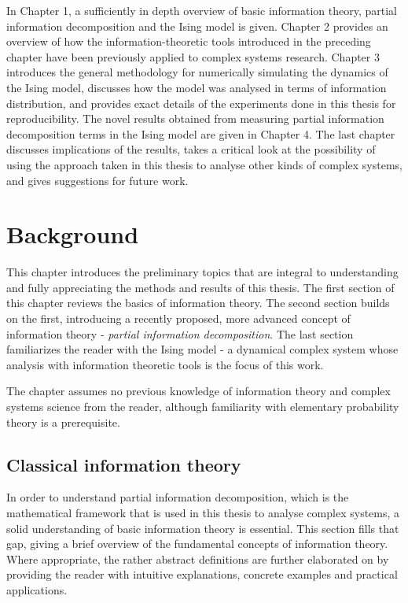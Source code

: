 \documentclass[12pt]{article}
\begin{document}
In Chapter 1, a sufficiently in depth overview of basic information theory, partial information decomposition and the Ising model is given. Chapter 2 provides an overview of how the information-theoretic tools introduced in the preceding chapter have been previously applied to complex systems research. Chapter 3 introduces the general methodology for numerically simulating the dynamics of the Ising model, discusses how the model was analysed in terms of information distribution, and provides exact details of the experiments done in this thesis for reproducibility. The novel results obtained from measuring partial information decomposition terms in the Ising model are given in Chapter 4. The last chapter  discusses implications of the results, takes a critical look at the possibility of using the approach taken in this thesis to analyse other kinds of complex systems, and gives suggestions for future work.  

\newpage

\section{Background}

This chapter introduces the preliminary topics that are integral to understanding and fully appreciating the methods and results of this thesis. The first section of this chapter reviews the basics of information theory. The second section builds on the first, introducing a recently proposed, more advanced concept of information theory - \textit{partial information decomposition}. The last section familiarizes the reader with the Ising model - a dynamical complex system whose analysis with information theoretic tools is the focus of this work. 

The chapter assumes no previous knowledge of information theory and complex systems science from the reader, although familiarity with elementary probability theory is a prerequisite. 

\subsection{Classical information theory}

In order to understand partial information decomposition, which is the mathematical framework that is used in this thesis to analyse complex systems, a solid understanding of basic information theory is essential. This section fills that gap, giving a brief overview of the fundamental concepts of information theory. Where appropriate, the rather abstract definitions are further elaborated on by providing the reader with intuitive explanations, concrete examples and practical applications. 
\end{document}
